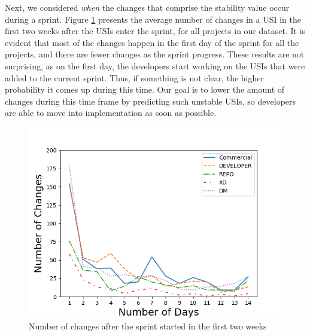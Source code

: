

Next, we considered \emph{when} the changes that comprise the stability value occur during a sprint. 
Figure \ref{fig:changes after sprint} presents the average number of changes in a USI in the first two weeks after the USIs enter the sprint, for all projects in our dataset. 
It is evident that most of the changes happen in the first day of the sprint for all the projects, and there are fewer changes as the sprint progress. 
These results are not surprising, as on the first day, the developers start working on the USIs that were added to the current sprint. Thus, if something is not clear, the higher probability it comes up during this time. 
Our goal is to lower the amount of changes during this time frame by predicting such unstable USIs, so developers are able to move into implementation as soon as possible. 

\begin{figure}[ht]
\centering
\includegraphics[width=.45\textwidth]{Figures/number_changes_after_sprint_two_weeks_only_new.png}\quad

\caption[Number changes two weeks]{\centering Number of changes after the sprint started in the first two weeks}
\label{fig:changes after sprint}
\end{figure}


